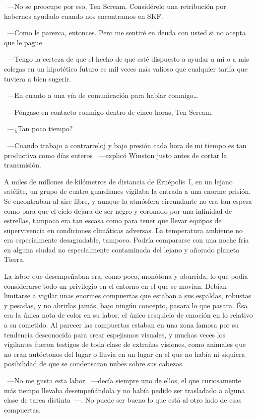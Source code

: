 ~---No se preocupe por eso, Ten Scream. Considérelo una retribución por habernos ayudado cuando nos encontramos en SKF.

~---Como le parezca, entonces. Pero me sentiré en deuda con usted si no acepta que le pague.

~---Tengo la certeza de que el hecho de que esté dispuesto a ayudar a mí o a mis colegas en un hipotético futuro es mil veces más valioso que cualquier tarifa que tuviera a bien sugerir.

~---En cuanto a una vía de comunicación para hablar conmigo\dots

~---Póngase en contacto conmigo dentro de cinco horas, Ten Scream.

~---¿Tan poco tiempo?

~---Cuando trabajo a contrarreloj y bajo presión cada hora de mi tiempo es tan productiva como días enteros ~---explicó Winston justo antes de cortar la transmisión.

\parbreak
A miles de millones de kilómetros de distancia de Ernépolis~I, en un lejano satélite, un grupo de cuatro guardianes vigilaba la entrada a una enorme prisión. Se encontraban al aire libre, y aunque la atmósfera circundante no era tan espesa como para que el cielo dejara de ser negro y coronado por una infinidad de estrellas, tampoco era tan escasa como para tener que llevar equipos de supervivencia en condiciones climáticas adversas. La temperatura ambiente no era especialmente desagradable, tampoco. Podría compararse con una noche fría en alguna ciudad no especialmente contaminada del lejano y añorado planeta Tierra.

La labor que desempeñaban era, como poco, monótona y aburrida, lo que podía considerarse todo un privilegio en el entorno en el que se movían. Debían limitarse a vigilar unas enormes compuertas que estaban a sus espaldas, robustas y pesadas, y no abrirlas jamás, bajo ningún concepto, pasara lo que pasara. Ésa era la única nota de color en su labor, el único resquicio de emoción en lo relativo a su cometido. Al parecer las compuertas estaban en una zona famosa por su tendencia desconocida para crear espejismos visuales, y muchas veces los vigilantes fueron testigos de toda clase de extrañas visiones, como animales que no eran autóctonos del lugar o lluvia en un lugar en el que no había ni siquiera posibilidad de que se condensaran nubes sobre sus cabezas.

~---No me gusta esta labor ~---decía siempre uno de ellos, el que curiosamente más tiempo llevaba desempeñándola y no había pedido ser trasladado a alguna clase de tarea distinta~---. No puede ser bueno lo que está al otro lado de esas compuertas.

